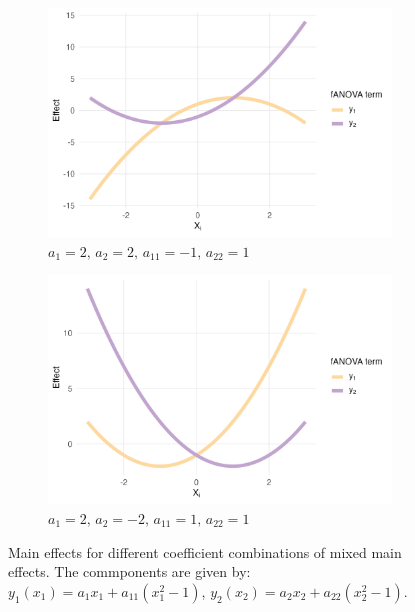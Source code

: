 \begin{figure}[htpb]
    \begin{subfigure}[t]{0.49\textwidth}
        \centering
        \includegraphics[width=\textwidth]{images/experiment_section/mixed_a1p20_a2p20_a11m10_a22p10_a12p00_rhop00_main.png}
        \caption{$a_1=2,\, a_2=2,\, a_{11}=-1,\, a_{22}=1$}
        \label{fig:mixed_rho_0_panel3}
    \end{subfigure}%
    \hfill
    \begin{subfigure}[t]{0.49\textwidth}
        \centering
        \includegraphics[width=\textwidth]{images/experiment_section/mixed_a1p20_a2m20_a11p10_a22p10_a12p00_rhop00_main.png}
        \caption{$a_1=2,\, a_2=-2,\, a_{11}=1,\, a_{22}=1$}
        \label{fig:mixed_rho_0_panel4}
    \end{subfigure}

    \caption{Main effects for different coefficient combinations of mixed main effects. The commponents are given by: $y_1(x_1) = a_1 x_1 + a_{11}(x_1^2 - 1)$, $y_2(x_2) = a_2 x_2 + a_{22}(x_2^2 - 1)$.}
    \label{fig:mixed_main_effects}
\end{figure}

